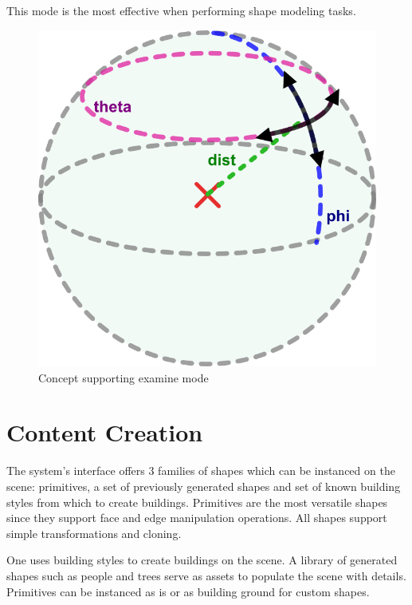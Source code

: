 This mode is the most effective when performing shape modeling tasks.


\begin{figure}[ht]
	\centering
		\includegraphics[scale=0.6]{gfx/virtual-sphere.png}
	\caption{Concept supporting examine mode}
	\label{fig:vsphere}
\end{figure}


\section{Content Creation}

The system's interface offers 3 families of shapes which can be instanced on the scene:
primitives, a set of previously generated shapes and set of known building styles from which to create buildings.
Primitives are the most versatile shapes since they support face and edge manipulation operations.
All shapes support simple transformations and cloning.

One uses building styles to create buildings on the scene. A library of generated shapes such as
people and trees serve as assets to populate the scene with details.
Primitives can be instanced as is or as building ground for custom shapes.


